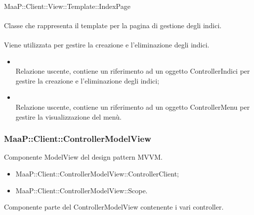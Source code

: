	\\
	MaaP::Client::View::Template::IndexPage\\
	\\
	Classe che rappresenta il template per la pagina di gestione degli indici.\\
	\\
	Viene utilizzata per gestire la creazione e l'eliminazione degli indici.
	\begin{itemize}
	\item{}\\
	Relazione uscente, contiene un riferimento ad un oggetto ControllerIndici per gestire la creazione e l'eliminazione degli indici;
	\item{}\\
	Relazione uscente, contiene un riferimento ad un oggetto ControllerMenu per gestire la visualizzazione del menù.
	\end{itemize}

\subsubsection{MaaP::Client::ControllerModelView}
Componente ModelView del design pattern MVVM.
\begin{itemize}
\item MaaP::Client::ControllerModelView::ControllerClient;
\item MaaP::Client::ControllerModelView::Scope.
\end{itemize}

Componente parte del ControllerModelView contenente i vari controller.

